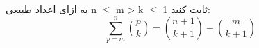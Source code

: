 \p
به ازای اعداد طبیعی
n $\leq$ m > k $\leq$ 1
ثابت کنید:
\[
    \sum\limits_{p=m}^{n}\binom{p}{k} = \binom{n + 1}{k + 1} - \binom{m}{k + 1}
\]